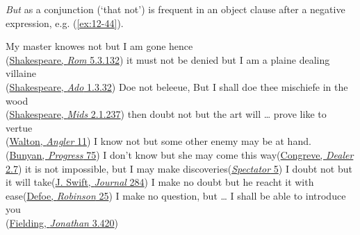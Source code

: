 \bigskip
\textit{But} as a conjunction (`that not') is frequent in an object clause after a negative expression, e.g. (\ref{ex:12-44}).

\ea \label{ex:12-44}
\ea\label{ex:WS1}
My master knowes not but I am gone hence\\\hfill(\href{https://internetshakespeare.uvic.ca/doc/Rom_F1/scene/5.3/index.html#tln-2990}{Shakespeare, \textit{Rom} 5.3.132}) 
\ex\label{ex:WS2}
it must not be denied but I am a plaine dealing villaine\\\hfill(\href{https://internetshakespeare.uvic.ca/doc/Ado_F1/scene/1.3/index.html#tln-370}{Shakespeare, \textit{Ado} 1.3.32})
\ex
Doe not beleeue, But I shall doe thee mischiefe in the wood\\\hfill(\href{https://internetshakespeare.uvic.ca/doc/MND_F1/scene/2.1/index.html#tln-615}{Shakespeare, \textit{Mids} 2.1.237}) %
\ex
then doubt not but the art will {\dots} prove like to vertue\\\hfill(\href{https://archive.org/details/complangler00waltrich/page/36/mode/2up?q=%22but+the+art+will%22&view=theater}{Walton, \textit{Angler} 11})
\ex
I know not but some other enemy may be at hand.\\\hfill(\href{https://archive.org/details/bunyanspilgrims00moffgoog/page/80/mode/2up?q=%22some+other+enemy+may%22&view=theater}{Bunyan, \textit{Progress} 75}) 
\ex
I don't know but she may come this way\hfill(\href{https://archive.org/details/bim_eighteenth-century_the-double-dealer-a-com_congreve-william_1711/page/44/mode/2up?q=%22know+but+she+may+come+this+way%22&view=theater}{Congreve, \textit{Dealer} 2.7})
\ex
it is not impossible, but I may make discoveries\hfill(\href{https://archive.org/details/spectatornewedre00addiuoft/page/4/mode/2up?q=%22it+is+not+impossible%22&view=theater}{\textit{Spectator} 5})
\ex
I doubt not but it will take\hfill(\href{https://archive.org/details/journaltostellae00swifuoft/page/284/mode/2up?q=%22I+doubt+not+but%22&view=theater}{J. Swift, \textit{Journal} 284})
\ex
I make no doubt but he reacht it with ease\hfill(\href{https://archive.org/details/lifeandstranges00dobsgoog/page/n51/mode/2up?q=%22make+no+doubt%22&view=theater}{Defoe, \textit{Robinson} 25}) 
\ex
I make no question, but {\dots} I shall be able to introduce you\\\hfill(\href{https://archive.org/details/bim_eighteenth-century_jonathan-wild-the-his_fielding-henry_1795/page/18/mode/2up?q=%22make+no+question%22&view=theater}{Fielding, \textit{Jonathan} 3.420}) %
